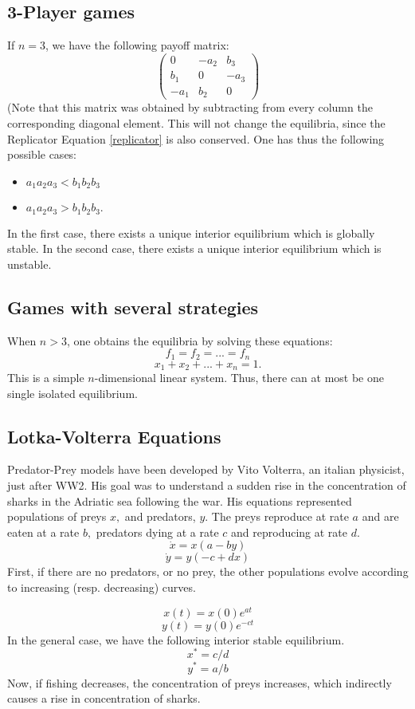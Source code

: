 \subsection{3-Player games}
If $n=3$, we have the following payoff matrix:
\[
\begin{pmatrix}
	0 & -a_{2} & b_{3} \\
	b_{1} & 0 & -a_{3} \\
	-a_{1} & b_2 & 0
\end{pmatrix}
\]
(Note that this matrix was obtained by subtracting from every column the corresponding diagonal element.  This will not change the equilibria, since the Replicator Equation \eqref{replicator} is also conserved.  One has thus the following possible cases:
\begin{itemize}
\item $a_1a_2a_3<b_1b_2b_3$
\item $a_1a_2a_3>b_1b_2b_3.$
\end{itemize}
In the first case, there exists a unique interior equilibrium which is globally stable.  In the second case, there exists a unique interior equilibrium which is unstable.
\subsection{Games with several strategies}
When $n>3$, one obtains the equilibria by solving these equations:
\[f_1 = f_2 = ... = f_n\]
\[x_1+x_2+...+x_n = 1.\]
This is a simple $n$-dimensional linear system.  Thus, there can at most be one single isolated equilibrium.
\subsection{Lotka-Volterra Equations}

Predator-Prey models have been developed by Vito Volterra, an italian physicist, just after WW2.  His goal was to understand a sudden rise in the concentration of sharks in the Adriatic sea following the war.  His equations represented populations of preys $x,$ and predators, $y.$  The preys reproduce at rate $a$ and are eaten at a rate $b,$ predators dying at a rate $c$ and reproducing at rate $d.$
\[\dot{x} = x(a-by)\]
\[\dot{y} = y(-c+dx)\]
First, if there are no predators, or no prey, the other populations evolve according to increasing (resp. decreasing) curves.

\[x(t)=x(0)e^{at}\]
\[y(t)=y(0)e^{-ct}\]
In the general case, we have the following interior stable equilibrium.
\[x^*=c/d\]
\[y^*=a/b\]
Now, if fishing decreases, the concentration of preys increases, which indirectly causes a rise in concentration of sharks.


